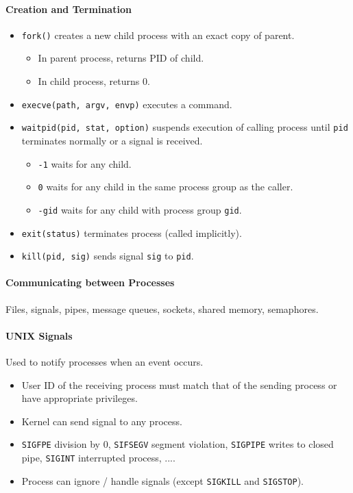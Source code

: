 \documentclass[twocolumn,english]{article}
\begin{document}
\paragraph{Creation and Termination}
\begin{itemize}
\item \texttt{fork()} creates a new child process with an exact copy of
parent. 
\begin{itemize}
\item In parent process, returns PID of child.
\item In child process, returns 0.
\end{itemize}
\item \texttt{execve(path, argv, envp)} executes a command.
\item \texttt{waitpid(pid, stat, option)} suspends execution of calling
process until \texttt{pid} terminates normally or a signal is received.
\begin{itemize}
\item \texttt{-1} waits for any child.
\item \texttt{0} waits for any child in the same process group as the caller.
\item \texttt{-gid} waits for any child with process group \texttt{gid}.
\end{itemize}
\item \texttt{exit(status)} terminates process (called implicitly).
\item \texttt{kill(pid, sig)} sends signal \texttt{sig} to \texttt{pid}.
\end{itemize}

\paragraph{Communicating between Processes}

Files, signals, pipes, message queues, sockets, shared memory, semaphores.

\paragraph{UNIX Signals}

Used to notify processes when an event occurs.
\begin{itemize}
\item User ID of the receiving process must match that of the sending process
or have appropriate privileges.
\item Kernel can send signal to any process.
\item \texttt{SIGFPE} division by 0, \texttt{SIFSEGV} segment violation,
\texttt{SIGPIPE} writes to closed pipe, \texttt{SIGINT} interrupted
process, ....
\item Process can ignore / handle signals (except \texttt{SIGKILL} and \texttt{SIGSTOP}).
\end{itemize}
\end{document}
